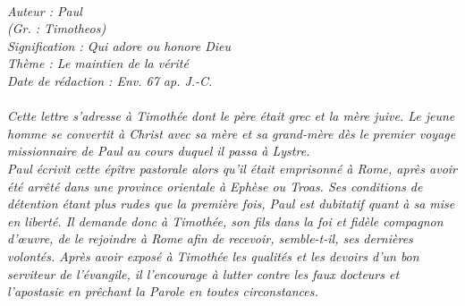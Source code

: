 \BFont
\noindent\hrulefill
{\footnotesize
\textit{
\bigskip
{\centering{}
\\Auteur : Paul
\\(Gr. : Timotheos)
\\Signification : Qui adore ou honore Dieu
\\Thème : Le maintien de la vérité
\\Date de rédaction : Env. 67 ap. J.-C.\\}
}
\textit{
\\Cette lettre s’adresse à Timothée dont le père était grec et la mère juive. Le jeune homme se convertit à Christ avec sa
mère et sa grand-mère dès le premier voyage missionnaire de Paul au cours duquel il passa à Lystre.
\\Paul écrivit cette épître pastorale  alors qu’il était emprisonné à Rome, après avoir été arrêté dans une province orientale à Ephèse ou Troas.
Ses conditions de détention étant plus rudes que la première fois, Paul est dubitatif quant à sa mise en liberté. Il
demande donc à Timothée, son fils dans la foi et fidèle compagnon d’œuvre, de le rejoindre à Rome afin de
recevoir, semble-t-il, ses dernières volontés. Après avoir exposé à Timothée les qualités et les devoirs d’un bon serviteur de l’évangile, il l’encourage à lutter contre les faux docteurs et l’apostasie en prêchant la Parole en toutes circonstances.\bigskip
}
}
\par\nobreak\noindent\hrulefill
